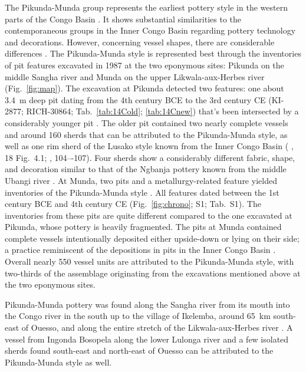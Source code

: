 \documentclass[smallextended,natbib]{svjour3}       %
\begin{document}
The Pikunda-Munda group represents the earliest pottery style in the western parts of the Congo Basin \citep[114--120]{Eggert.1992,Seidensticker.2021e}. It shows substantial similarities to the contemporaneous groups in the Inner Congo Basin regarding pottery technology and decorations. However, concerning vessel shapes, there are considerable differences \citep[107 Ftn.~4]{Wotzka.1995}. The Pikunda-Munda style is represented best through the inventories of pit features excavated in 1987 at the two eponymous sites: Pikunda on the middle Sangha river and Munda on the upper Likwala-aux-Herbes river (Fig.~\ref{fig:map}). The excavation at Pikunda detected two features: one about 3.4~m deep pit dating from the 4th century BCE to the 3rd century CE (KI-2877; RICH-30864; Tab.~\ref{tab:14Cold}; \ref{tab:14Cnew}) that's been intersected by a considerably younger pit \citep[288--300]{Seidensticker.2021e}. The older pit contained two nearly complete vessels and around 160 sherds that can be attributed to the Pikunda-Munda style, as well as one rim sherd of the Lusako style known from the Inner Congo Basin (\citeauthor{Eggert.1992} \citeyear{Eggert.1992}, 18 Fig.~4.1; \citeauthor{Wotzka.1995} \citeyear{Wotzka.1995}, 104–-107). Four sherds show a considerably different fabric, shape, and decoration similar to that of the Ngbanja pottery known from the middle Ubangi river \citep[296 Tab.~34]{Seidensticker.2021e}. At Munda, two pits and a metallurgy-related feature yielded inventories of the Pikunda-Munda style \citep[321--339]{Seidensticker.2021e}. All features dated between the 1st century BCE and 4th century CE (Fig.~\ref{fig:chrono}; S1; Tab.~S1). The inventories from these pits are quite different compared to the one excavated at Pikunda, whose pottery is heavily fragmented. The pits at Munda contained complete vessels intentionally deposited either upside-down or lying on their side; a practice reminiscent of the depositions in pits in the Inner Congo Basin \citep{Wotzka.1993}. Overall nearly 550 vessel units are attributed to the Pikunda-Munda style, with two-thirds of the assemblage originating from the excavations mentioned above at the two eponymous sites.

Pikunda-Munda pottery was found along the Sangha river from its mouth into the Congo river in the south up to the village of Ikelemba, around 65~km south-east of Ouesso, and along the entire stretch of the Likwala-aux-Herbes river \citep[Fig.~\ref{fig:timeslices_1_eia}B--D;][119 Fig.~49]{Seidensticker.2021e}. A vessel from Ingonda Bosopela along the lower Lulonga river \citep[119 Ftn. 4, 531 Pl. 97.5]{Wotzka.1995} and a few isolated sherds found south-east and north-east of Ouesso \citep[114 Fig.~42]{Gillet.2013} can be attributed to the Pikunda-Munda style as well.
\end{document}
